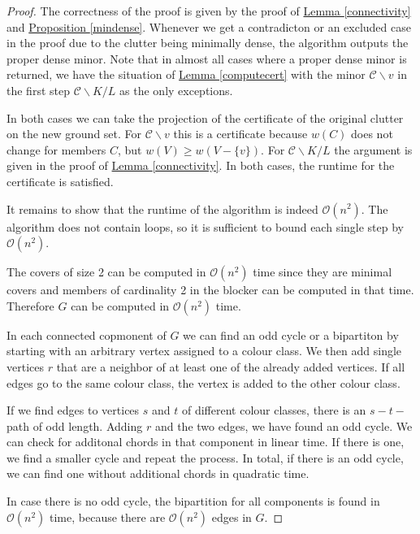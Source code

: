 \documentclass[a4paper, 12pt]{scrbook}
\theoremstyle{definition}
\begin{document}
   \begin{proof}
       The correctness of the proof is given by the proof of \hyperref[connectivity]{Lemma \ref*{connectivity}} and \hyperref[mindense]{Proposition \ref*{mindense}}.
       Whenever we get a contradicton or an excluded case in the proof due to the clutter being minimally dense, the algorithm outputs the proper dense minor.
       Note that in almost all cases where a proper dense minor is returned, we have the situation of \hyperref[computecert]{Lemma \ref*{computecert}} with the minor $\mathcal{C}\backslash v$ in the first step $\mathcal{C} \backslash K / L$ as the only exceptions.

       In both cases we can take the projection of the certificate of the original clutter on the new ground set.
       For $\mathcal{C} \backslash v$ this is a certificate because $w(C)$ does not change for members $C$, but $w(V) \geq w(V-\{v\})$.
       For $\mathcal{C} \backslash K / L$ the argument is given in the proof of \hyperref[connectivity]{Lemma \ref*{connectivity}}.
       In both cases, the runtime for the certificate is satisfied.

       It remains to show that the runtime of the algorithm is indeed $\mathcal{O}(n^2)$.
       The algorithm does not contain loops, so it is sufficient to bound each single step by $\mathcal{O}(n^2)$.

       The covers of size 2 can be computed in $\mathcal{O}(n^2)$ time since they are minimal covers and members of cardinality 2 in the blocker can be computed in that time.
       Therefore $G$ can be computed in $\mathcal{O}(n^2)$ time.

       In each connected copmonent of $G$ we can find an odd cycle or a bipartiton by starting with an arbitrary vertex assigned to a colour class. We then add single vertices $r$ that are a neighbor of at least one of the already added vertices. If all edges go to the same colour class, the vertex is added to the other colour class.

       If we find edges to vertices $s$ and $t$ of different colour classes, there is an $s-t-$path of odd length. Adding $r$ and the two edges, we have found an odd cycle. We can check for additonal chords in that component in linear time. If there is one, we find a smaller cycle and repeat the process. In total, if there is an odd cycle, we can find one without additional chords in quadratic time.

       In case there is no odd cycle, the bipartition for all components is found in $\mathcal{O}(n^2)$ time, because there are $\mathcal{O}(n^2)$ edges in $G$.


\end{proof}
\end{document}
